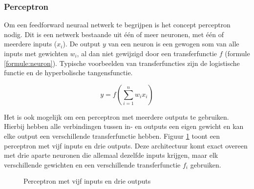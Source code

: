 \subsubsection{Perceptron} %
\label{par:perceptron}

Om een feedforward neuraal netwerk te begrijpen is het concept perceptron nodig. Dit is een netwerk bestaande uit \'e\'en of meer neuronen, met \'e\'en of meerdere inputs ($x_i$). De output $y$ van een neuron is een gewogen som van alle inputs met gewichten $w_i$, al dan niet gewijzigd door een transferfunctie $f$ (formule \ref{formule:neuron}). Typische voorbeelden van transferfuncties zijn de logistische functie en de hyperbolische tangensfunctie.

\begin{equation}
    y = f(\sum\limits_{i=1}^{n}w_i x_i)
    \label{formule:neuron}
\end{equation}

Het is ook mogelijk om een perceptron met meerdere outputs te gebruiken. Hierbij hebben alle verbindingen tussen in- en outputs een eigen gewicht en kan elke output een verschillende transferfunctie hebben. Figuur \ref{fig:perceptron} toont een perceptron met vijf inputs en drie outputs. Deze architectuur komt exact overeen met drie aparte neuronen die allemaal dezelfde inputs krijgen, maar elk verschillende gewichten en een verschillende transferfunctie $f_i$ gebruiken.

\begin{figure}[ht]
\def\layersep{2.5cm}
\centering
{}
\caption{Perceptron met vijf inputs en drie outputs}
\label{fig:perceptron}
\end{figure}


